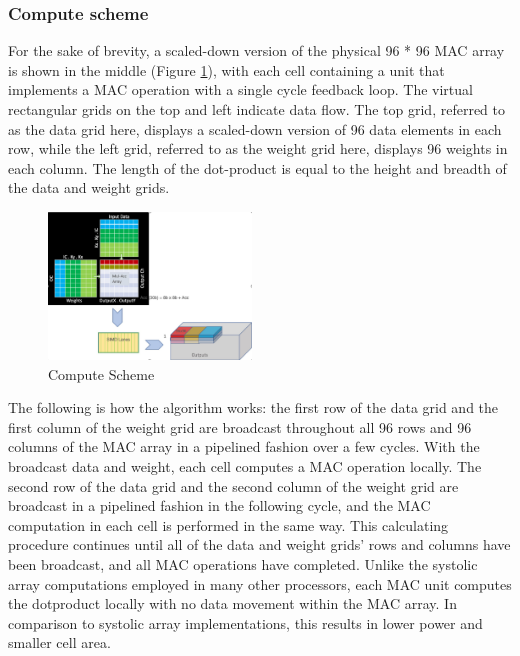 \documentclass[letterpaper, 10 pt, conference]{ieeeconf}  %
\begin{document}
\subsubsection{Compute scheme}

For the sake of brevity, a scaled-down version of the physical 96 * 96 MAC array is shown in the middle (Figure \ref{compute_scheme}), with each cell containing a unit that implements a MAC operation with a single cycle feedback loop. The virtual rectangular grids on the top and left indicate data flow. The top grid, referred to as the data grid here, displays a scaled-down version of 96 data elements in each row, while the left grid, referred to as the weight grid here, displays 96 weights in each column. The length of the dot-product is equal to the height and breadth of the data and weight grids.

\begin{figure}[hbt!]
\centering
\includegraphics[width=0.48\textwidth]{gfx/Compute_scheme.png}
\caption{Compute Scheme}
\label{compute_scheme}
\end{figure}

The following is how the algorithm works: the first row of the data grid and the first column of the weight grid are broadcast throughout all 96 rows and 96 columns of the MAC array in a pipelined fashion over a few cycles. With the broadcast data and weight, each cell computes a MAC operation locally. The second row of the data grid and the second column of the weight grid are broadcast in a pipelined fashion in the following cycle, and the MAC computation in each cell is performed in the same way. This calculating procedure continues until all of the data and weight grids' rows and columns have been broadcast, and all MAC operations have completed. Unlike the systolic array computations employed in many other processors, each MAC unit computes the dotproduct locally with no data movement within the MAC array. In comparison to systolic array implementations, this results in lower power and smaller cell area\cite{fsd_computer}.
\end{document}
